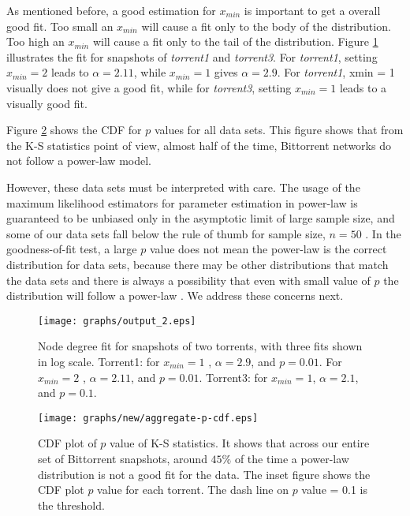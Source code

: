 \documentclass[paper]{ieice}
\begin{document}
As mentioned before, a good estimation for $x_{min}$ is important to get a overall good fit.
Too small an $x_{min}$ will cause a fit only to the body of the distribution.
Too high an $x_{min}$ will cause a fit only to the tail of the distribution.
Figure  \ref{fig:fitting} illustrates the fit for snapshots of \emph{torrent1} and \emph{torrent3}.
For \emph{torrent1}, setting $x_{min}=2$  leads to  $\alpha=2.11$, while $x_{min}=1$ gives $\alpha=2.9$.
For \emph{torrent1}, xmin = 1 visually does not give a good fit, while for  \emph{torrent3}, setting $x_{min}=1$ leads to a visually good fit.

Figure  \ref{fig:cdf-p} shows the CDF for $p$ values for all data sets. 
This figure shows that from the K-S statistics point of view, almost half of the time, Bittorrent networks do not follow a power-law model.

However, these data sets must be interpreted with care. 
The usage of the maximum likelihood estimators for parameter estimation in power-law is guaranteed to be unbiased only in the asymptotic limit of large sample size, and some of our data sets fall below the rule of thumb for sample size, $n=50$ \cite{clauset2009power}. 
In the goodness-of-fit test, a large $p$ value does not mean the power-law  is the correct distribution for data sets, because there may be other distributions that match the data sets and there is always a possibility that even with small value of $p$ the distribution will follow a power-law \cite{clauset2009power}. 
We address these concerns next.

\begin{figure}[!tb]
\begin{center}
\texttt{[image: graphs/output\_2.eps]}
\end{center}
\caption{Node degree fit for snapshots of two torrents, with three fits shown in log scale. Torrent1: for $x_{min}=1$ , $\alpha = 2.9$, and $p=0.01$. For $x_{min}=2$ , $\alpha = 2.11$, and $p = 0.01$. Torrent3: for $x_{min}=1$, $\alpha = 2.1$, and $p = 0.1$. }
\label{fig:fitting}
\vspace{-2mm}
\end{figure}

\begin{figure}[!tb]
\begin{center}
\texttt{[image: graphs/new/aggregate-p-cdf.eps]}
\end{center}
\caption{CDF plot of $p$ value of K-S statistics. It shows that across our entire set of Bittorrent snapshots, around $45\%$ of the time a power-law distribution is not a good fit for the data. 
The inset figure shows the CDF plot $p$ value for each torrent. The dash line on $p$ value = 0.1 is the threshold.} 
\label{fig:cdf-p}
\vspace{-2mm}
\end{figure}
\end{document}
